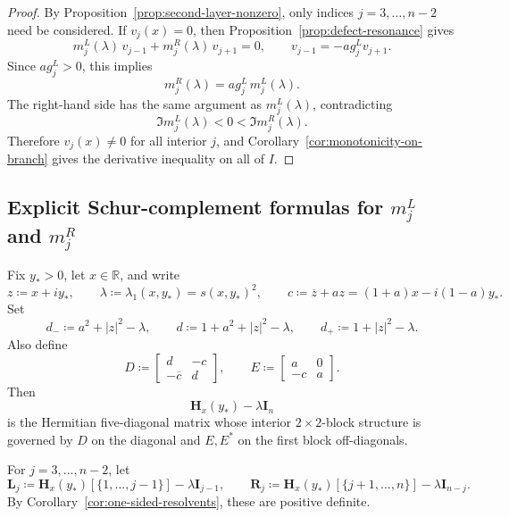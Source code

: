 \documentclass[11pt]{article}
\begin{document}
\begin{proof}
By Proposition~\ref{prop:second-layer-nonzero}, only indices \(j=3,\dots,n-2\) need be considered. If \(v_j(x)=0\), then Proposition~\ref{prop:defect-resonance} gives
\[
m_j^{L}(\lambda)\,v_{j-1}+m_j^{R}(\lambda)\,v_{j+1}=0,
\qquad
v_{j-1}=-a g_j^{L}v_{j+1}.
\]
Since \(a g_j^{L}>0\), this implies
\[
m_j^{R}(\lambda)=a g_j^{L}\,m_j^{L}(\lambda).
\]
The right-hand side has the same argument as \(m_j^{L}(\lambda)\), contradicting
\[
\Im m_j^{L}(\lambda)<0<\Im m_j^{R}(\lambda).
\]
Therefore \(v_j(x)\neq 0\) for all interior \(j\), and Corollary~\ref{cor:monotonicity-on-branch} gives the derivative inequality on all of \(I\).
\end{proof}


\subsection*{Explicit Schur-complement formulas for \(m_j^L\) and \(m_j^R\)}

Fix \(y_*>0\), let \(x\in\mathbb R\), and write
\[
z\coloneqq x+iy_*,
\qquad
\lambda\coloneqq \lambda_1(x,y_*)=s(x,y_*)^2,
\qquad
c\coloneqq \overline z + a z=(1+a)x-i(1-a)y_*.
\]
Set
\[
d_-\coloneqq a^2+|z|^2-\lambda,
\qquad
d\coloneqq 1+a^2+|z|^2-\lambda,
\qquad
d_+\coloneqq 1+|z|^2-\lambda.
\]
Also define
\[
D\coloneqq
\begin{bmatrix}
d & -c\\
-\overline c & d
\end{bmatrix},
\qquad
E\coloneqq
\begin{bmatrix}
a&0\\
-c&a
\end{bmatrix}.
\]
Then
\[
\mathbf H_x(y_*)-\lambda \mathbf I_n
\]
is the Hermitian five-diagonal matrix whose interior \(2\times2\)-block structure is governed by
\(D\) on the diagonal and \(E,E^*\) on the first block off-diagonals.

For \(j=3,\dots,n-2\), let
\[
\mathbf L_j\coloneqq \mathbf H_x(y_*)[\{1,\dots,j-1\}] - \lambda \mathbf I_{j-1},
\qquad
\mathbf R_j\coloneqq \mathbf H_x(y_*)[\{j+1,\dots,n\}] - \lambda \mathbf I_{n-j}.
\]
By Corollary~\ref{cor:one-sided-resolvents}, these are positive definite.
\end{document}
